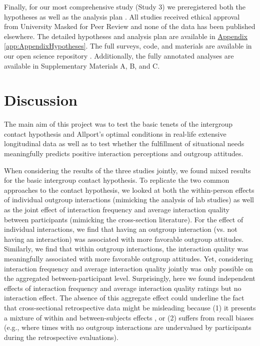 \documentclass[man, 12pt, a4paper, mask]{apa7}
\theoremstyle{break}
\theoremstyle{plain}
\newcommand{\appref}[2][]{\hyperref[#2]{Appendix \ref*{#2}#1}}
\begin{document}
Finally, for our most comprehensive study (Study 3) we preregistered both the hypotheses as well as the analysis plan \citep[available at][]{KreienkampMasked2021f}. All studies received ethical approval from University Masked for Peer Review and none of the data has been published elsewhere. The detailed hypotheses and analysis plan are available in \appref{app:AppendixHypotheses}. The full surveys, code, and materials are available in our open science repository \citep[including a complete codebook;][]{KreienkampMasked2022a}. Additionally, the fully annotated analyses are available in Supplementary Materials A, B, and C.



\section{Discussion}
The main aim of this project was to test the basic tenets of the intergroup contact hypothesis and Allport's optimal conditions in real-life extensive longitudinal data as well as to test whether the fulfillment of situational needs meaningfully predicts positive interaction perceptions and outgroup attitudes. 

When considering the results of the three studies jointly, we found mixed results for the basic intergroup contact hypothesis. To replicate the two common approaches to the contact hypothesis, we looked at both the within-person effects of individual outgroup interactions (mimicking the analysis of lab studies) as well as the joint effect of interaction frequency and average interaction quality between participants (mimicking the cross-section literature). For the effect of individual interactions, we find that having an outgroup interaction (vs. not having an interaction) was associated with more favorable outgroup attitudes. Similarly, we find that within outgroup interactions, the interaction quality was meaningfully associated with more favorable outgroup attitudes. Yet, considering interaction frequency and average interaction quality jointly was only possible on the aggregated between-participant level. Surprisingly, here we found independent effects of interaction frequency and average interaction quality ratings but no interaction effect. The absence of this aggregate effect could underline the fact that cross-sectional retrospective data might be misleading because (1) it presents a mixture of within and between-subjects effects \citep[][]{Hamaker2020}, or (2) suffers from recall biases (e.g., where times with no outgroup interactions are undervalued by participants during the retrospective evaluations). 
\end{document}
